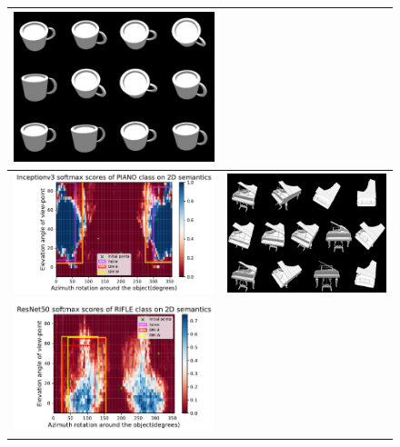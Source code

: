 \begin{figure}[h]
\begin{tabular}{c|c}
 \includegraphics[width = 7.5cm]{supimages/qualitative/cup/cup_s.png}\\ \hline 
\includegraphics[width = 9.5cm]{supimages/qualitative/Inceptionv3_piano_1_regions.pdf} &  
\includegraphics[width = 7.5cm]{supimages/qualitative/piano/piano_s.png}\\ \hline 
 \includegraphics[width = 9.5cm]{supimages/qualitative/ResNet50_rifle_1_regions.pdf} & 

\end{tabular}
\end{figure}
